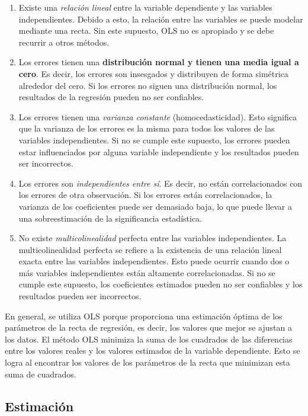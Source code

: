 \documentclass[
]{book}
\begin{document}
\begin{enumerate}
\def\labelenumi{\arabic{enumi}.}
\item
  Existe una \emph{relación lineal} entre la variable dependiente y las
  variables independientes. Debido a esto, la relación entre las
  variables se puede modelar mediante una recta. Sin este supuesto,
  OLS no es apropiado y se debe recurrir a otros métodos.
\item
  Los errores tienen una \textbf{distribución normal y tienen una media
  igual a cero}. Es decir, los errores son insesgados y distribuyen
  de forma simétrica alrededor del cero. Si los errores no siguen una
  distribución normal, los resultados de la regresión pueden no ser
  confiables.
\item
  Los errores tienen una \emph{varianza constante} (homocedasticidad). Esto
  significa que la varianza de los errores es la misma para todos los
  valores de las variables independientes. Si no se cumple este
  supuesto, los errores pueden estar influenciados por alguna variable
  independiente y los resultados pueden ser incorrectos.
\item
  Los errores son \emph{independientes entre sí}. Es decir, no están
  correlacionados con los errores de otra observación. Si los errores
  están correlacionados, la varianza de los coeficientes puede ser
  demasiado baja, lo que puede llevar a una sobreestimación de la
  significancia estadística.
\item
  No existe \emph{multicolinealidad} perfecta entre las variables
  independientes. La multicolinealidad perfecta se refiere a la
  existencia de una relación lineal exacta entre las variables
  independientes. Esto puede ocurrir cuando dos o más variables
  independientes están altamente correlacionadas. Si no se cumple este
  supuesto, los coeficientes estimados pueden no ser confiables y los
  resultados pueden ser incorrectos.
\end{enumerate}

En general, se utiliza OLS porque proporciona una estimación óptima de
los parámetros de la recta de regresión, es decir, los valores que mejor
se ajustan a los datos. El método OLS minimiza la suma de los cuadrados
de las diferencias entre los valores reales y los valores estimados de
la variable dependiente. Esto se logra al encontrar los valores de los
parámetros de la recta que minimizan esta suma de cuadrados.

\subsection{Estimación}\label{estimaciuxf3n-3}
\end{document}
